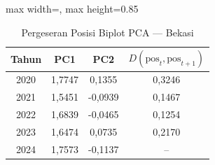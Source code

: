 \begin{table}[H]
\centering
\caption{Pergeseran Posisi Biplot PCA --- Bekasi} \label{tab:appjarak_pca_skor_bekasi}
\begin{adjustbox}{max width=\textwidth, max height=0.85\textheight}
\begin{tabular}{|c|c|c|c|}
\hline
\textbf{Tahun} & \textbf{PC1} & \textbf{PC2} & \textbf{$D(\text{pos}_t, \text{pos}_{t+1})$} \\
\hline
2020 & 1,7747 & 0,1355 & 0,3246 \\
2021 & 1,5451 & -0,0939 & 0,1467 \\
2022 & 1,6839 & -0,0465 & 0,1254 \\
2023 & 1,6474 & 0,0735 & 0,2170 \\
2024 & 1,7573 & -0,1137 & -- \\
\hline
\end{tabular}
\end{adjustbox}
\end{table}